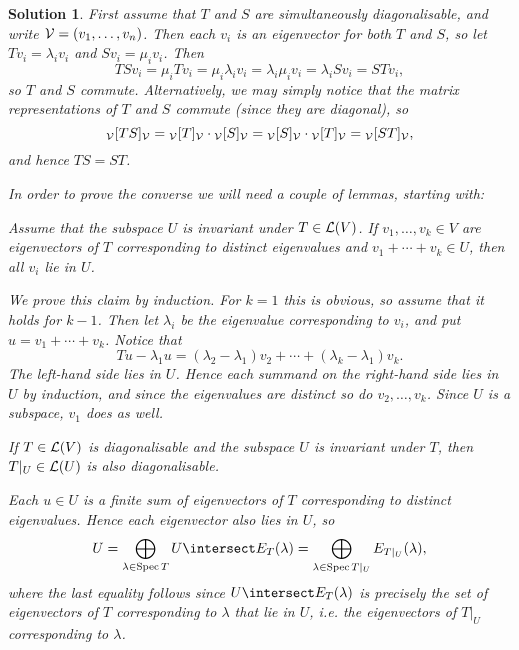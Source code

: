 \documentclass[article, a4paper, 11pt, oneside]{memoir}
\numberwithin{equation}{chapter}
\theoremstyle{nonumberplain}
\newtheorem{solution}{Solution}
\begin{document}
\begin{solution}
    First assume that $T$ and $S$ are simultaneously diagonalisable, and write $\mathcal{V} = (v_1, \ldots, v_n)$. Then each $v_i$ is an eigenvector for both $T$ and $S$, so let $Tv_i = \lambda_i v_i$ and $Sv_i = \mu_i v_i$. Then
    \begin{equation*}
        TSv_i
            = \mu_i Tv_i
            = \mu_i \lambda_i v_i
            = \lambda_i \mu_i v_i
            = \lambda_i Sv_i
            = STv_i,
    \end{equation*}
    so $T$ and $S$ commute. Alternatively, we may simply notice that the matrix representations of $T$ and $S$ commute (since they are diagonal), so
    \begin{equation*}
        {}_{\mathcal{V}}[TS]_{\mathcal{V}}
            = {}_{\mathcal{V}}[T]_{\mathcal{V}} \cdot {}_{\mathcal{V}}[S]_{\mathcal{V}}
            = {}_{\mathcal{V}}[S]_{\mathcal{V}} \cdot {}_{\mathcal{V}}[T]_{\mathcal{V}}
            = {}_{\mathcal{V}}[ST]_{\mathcal{V}},
    \end{equation*}
    and hence $TS = ST$.

    In order to prove the converse we will need a couple of lemmas, starting with:
    \begin{displaytheorem}
        Assume that the subspace $U$ is invariant under $T \in \mathcal{L}(V)$. If $v_1, \ldots, v_k \in V$ are eigenvectors of $T$ corresponding to distinct eigenvalues and $v_1 + \cdots + v_k \in U$, then all $v_i$ lie in $U$.
    \end{displaytheorem}
    We prove this claim by induction. For $k = 1$ this is obvious, so assume that it holds for $k-1$. Then let $\lambda_i$ be the eigenvalue corresponding to $v_i$, and put $u = v_1 + \cdots + v_k$. Notice that
    \begin{equation*}
        Tu - \lambda_1 u
            = (\lambda_2 - \lambda_1)v_2 + \cdots + (\lambda_k - \lambda_1)v_k.
    \end{equation*}
    The left-hand side lies in $U$. Hence each summand on the right-hand side lies in $U$ by induction, and since the eigenvalues are distinct so do $v_2, \ldots, v_k$. Since $U$ is a subspace, $v_1$ does as well.
    
    \begin{displaytheorem}
        If $T \in \mathcal{L}(V)$ is diagonalisable and the subspace $U$ is invariant under $T$, then $T|_U \in \mathcal{L}(U)$ is also diagonalisable.
    \end{displaytheorem}
    Each $u \in U$ is a finite sum of eigenvectors of $T$ corresponding to distinct eigenvalues. Hence each eigenvector also lies in $U$, so
    \begin{equation*}
        U
            = \bigoplus_{\lambda \in \spec T} U \intersect E_T(\lambda)
            = \bigoplus_{\lambda \in \spec T|_U} E_{T|_U}(\lambda),
    \end{equation*}
    where the last equality follows since $U \intersect E_T(\lambda)$ is precisely the set of eigenvectors of $T$ corresponding to $\lambda$ that lie in $U$, i.e. the eigenvectors of $T|_U$ corresponding to $\lambda$. 
    

\end{solution}
\end{document}
